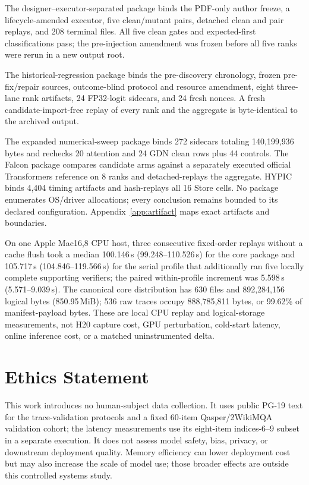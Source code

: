\documentclass{article}
\begin{document}
The designer--executor-separated package binds the PDF-only author freeze, a
lifecycle-amended executor, five clean/mutant pairs, detached clean and pair
replays, and 208 terminal files.  All five clean gates and expected-first
classifications pass; the pre-injection amendment was frozen before all five
ranks were rerun in a new output root.

The historical-regression package binds the pre-discovery chronology, frozen
pre-fix/repair sources, outcome-blind protocol and resource amendment, eight
three-lane rank artifacts, 24 FP32-logit sidecars, and 24 fresh nonces.  A fresh
candidate-import-free replay of every rank and the aggregate is byte-identical
to the archived output.

The expanded numerical-sweep package binds 272 sidecars totaling 140,199,936
bytes and rechecks 20 attention and 24 GDN clean rows plus 44 controls.  The
Falcon package compares candidate arms against a separately executed official
Transformers reference on 8 ranks and detached-replays the aggregate.  HYPIC
binds 4,404 timing artifacts and hash-replays all 16 Store cells.  No package
enumerates OS/driver allocations; every conclusion remains bounded to its
declared configuration.  Appendix~\ref{app:artifact} maps exact artifacts and
boundaries.

On one Apple Mac16,8 CPU host, three consecutive fixed-order replays without a
cache flush took a median 100.146\,s (99.248--110.526\,s) for the core package
and 105.717\,s (104.846--119.566\,s) for the serial profile that additionally
ran five locally complete supporting verifiers; the paired within-profile
increment was 5.598\,s (5.571--9.039\,s).  The canonical core distribution has
630 files and 892,284,156 logical bytes (850.95\,MiB); 536 raw traces occupy
888,785,811 bytes, or 99.62\% of manifest-payload bytes.  These are local CPU
replay and logical-storage measurements, not H20 capture cost, GPU perturbation,
cold-start latency, online inference cost, or a matched uninstrumented delta.

\section{Ethics Statement}

This work introduces no human-subject data collection.  It uses public PG-19
text for the trace-validation protocols and a fixed 60-item
Qasper/2WikiMQA validation cohort; the latency measurements use its eight-item
indices-6--9 subset in a separate execution.
It does not assess model safety, bias, privacy, or downstream deployment
quality.  Memory efficiency can lower deployment cost but may also increase
the scale of model use; those broader effects are outside this controlled
systems study.
\end{document}
